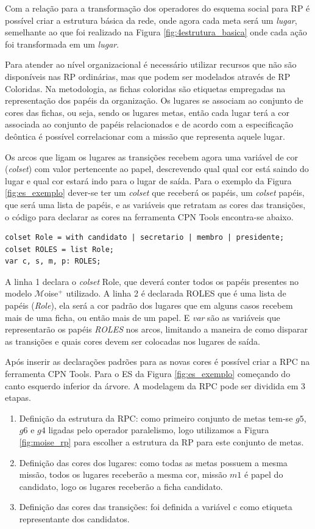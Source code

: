 Com a relação para a transformação dos operadores do esquema social para RP é possível criar a estrutura básica da rede, onde agora cada meta será um \textit{lugar}, semelhante ao que foi realizado na Figura \ref{fig:4estrutura_basica} onde cada ação foi transformada em um \textit{lugar}.  

Para atender ao nível organizacional é necessário utilizar recursos que não são disponíveis nas RP ordinárias, mas que podem ser modelados através de RP Coloridas. Na metodologia, as fichas coloridas são etiquetas empregadas na representação  dos papéis da organização. Os lugares se associam ao conjunto de cores das fichas, ou seja, sendo os lugares metas, então cada lugar terá a cor associada ao conjunto de papéis relacionados e de acordo com a especificação deôntica é possível correlacionar com a missão que representa aquele lugar.

Os arcos que ligam os lugares as transições recebem agora uma variável de cor (\textit{colset}) com valor pertencente ao papel, descrevendo qual qual cor está saindo do lugar e qual cor estará indo para o lugar de saída. Para o exemplo da Figura \ref{fig:es_exemplo} dever-se ter um \textit{colset} que receberá os papéis, um \textit{colset} papéis, que será uma lista de papéis, e as variáveis que retratam as cores das transições, o código para declarar as cores na ferramenta CPN Tools encontra-se abaixo.

\begin{lstlisting}
colset Role = with candidato | secretario | membro | presidente;
colset ROLES = list Role;
var c, s, m, p: ROLES;
\end{lstlisting}

A linha 1 declara o \textit{colset} Role, que deverá conter todos os papéis presentes no modelo $\mathcal{M}$oise$^{+}$ utilizado.  A linha 2 é declarada ROLES que é uma lista de papéis (\textit{Role}), ela será a cor padrão dos lugares que em alguns casos recebem mais de uma ficha, ou então mais de um papel. E \textit{var} são as variáveis que representarão os papéis \textit{ROLES} nos arcos, limitando a maneira de como disparar as transições e quais cores devem ser colocadas nos lugares de saída.

Após inserir as declarações padrões para as novas cores é possível criar a RPC na ferramenta CPN Tools. Para o ES da Figura \ref{fig:es_exemplo} começando do canto esquerdo inferior da árvore. A modelagem da RPC pode ser dividida em 3 etapas.

\begin{enumerate}
\item Definição da estrutura da RPC: como primeiro conjunto de metas tem-se $g5$, $g6$ e $g4$ ligadas pelo operador paralelismo, logo utilizamos a Figura \ref{fig:moise_rp} para escolher a estrutura da RP para este conjunto de metas.
\item Definição das cores dos lugares: como todas as metas possuem a mesma missão, todos os lugares receberão a mesma cor, missão $m1$ é papel do candidato, logo os lugares receberão a ficha candidato.
\item Definição das cores das transições: foi definida a variável c como etiqueta representante dos candidatos.
\end{enumerate}

